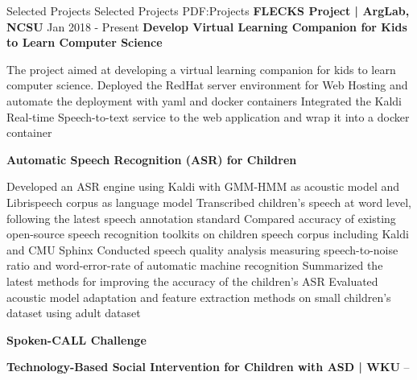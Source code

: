 \documentclass[letterpaper,MMMyyyy,nonstopmode]{simpleresumecv}
\begin{document}
\begin{Body}
\Section
{Selected Projects}
{Selected Projects}
{PDF:Projects}
\Entry
{\textbf{FLECKS Project | ArgLab, NCSU} \hfill Jan 2018 - Present}
\textbf{Develop Virtual Learning Companion for Kids to Learn Computer Science}
\begin{Detail}

\BulletItem
The project aimed at developing a virtual learning companion for kids to learn computer science.
Deployed the RedHat server environment for Web Hosting and automate the deployment with yaml and docker containers
\BulletItem
Integrated the Kaldi Real-time Speech-to-text service to the web application and wrap it into a docker container
\end{Detail}

\Entry
{\textbf{Automatic Speech Recognition (ASR) for Children}}
\begin{Detail}
\BulletItem
Developed an ASR engine using Kaldi with GMM-HMM as acoustic model and Librispeech corpus as language model
\BulletItem
Transcribed children's speech at word level, following the latest speech annotation standard
\BulletItem
Compared accuracy of existing open-source speech recognition toolkits on children speech corpus including Kaldi and CMU Sphinx
\BulletItem
Conducted speech quality analysis measuring speech-to-noise ratio and word-error-rate of automatic machine recognition
\BulletItem
Summarized the latest methods for improving the accuracy of the children's ASR
\BulletItem
Evaluated acoustic model adaptation and feature extraction methods on small children's dataset using adult dataset
\end{Detail}

\Entry
{\textbf{Spoken-CALL Challenge}}
\begin{Detail}
\BulletItem

\end{Detail}


\textbf{Technology-Based Social Intervention for Children with ASD | WKU } \hfill
{} --


\end{Body}
\end{document}
